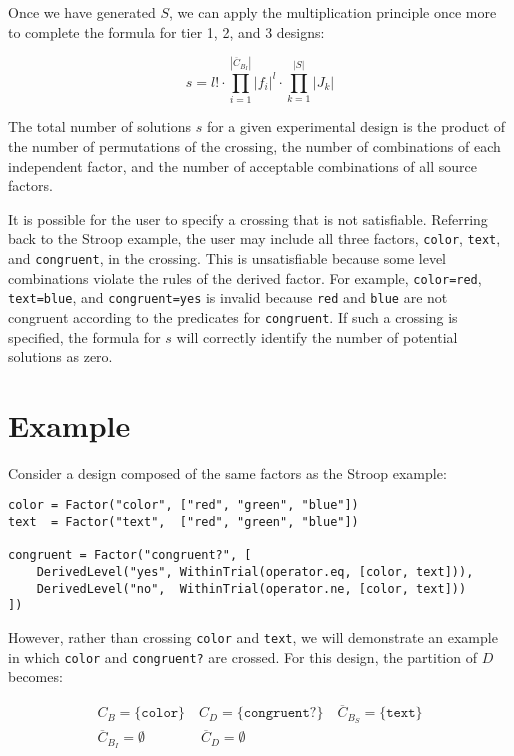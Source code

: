 Once we have generated $S$, we can apply the multiplication principle once more to complete the formula for tier 1, 2, and 3 designs:

\[
s = l! \cdot \prod_{i=1}^{|\overline{C}_{B_I}|} |f_i|^l \cdot \prod_{k=1}^{|S|} |J_k|
\]

The total number of solutions $s$ for a given experimental design is the product of the number of permutations of the crossing, the number of combinations of each independent factor, and the number of acceptable combinations of all source factors.

It is possible for the user to specify a crossing that is not satisfiable. Referring back to the Stroop example, the user may include all three factors, \texttt{color}, \texttt{text}, and \texttt{congruent}, in the crossing. This is unsatisfiable because some level combinations violate the rules of the derived factor. For example, \texttt{color=red}, \texttt{text=blue}, and \texttt{congruent=yes} is invalid because \texttt{red} and \texttt{blue} are not congruent according to the predicates for \texttt{congruent}. If such a crossing is specified, the formula for $s$ will correctly identify the number of potential solutions as zero.

\section{Example}

Consider a design composed of the same factors as the Stroop example:

\begin{verbatim}
color = Factor("color", ["red", "green", "blue"])
text  = Factor("text",  ["red", "green", "blue"])

congruent = Factor("congruent?", [
    DerivedLevel("yes", WithinTrial(operator.eq, [color, text])),
    DerivedLevel("no",  WithinTrial(operator.ne, [color, text]))
])
\end{verbatim}

However, rather than crossing \texttt{color} and \texttt{text}, we will demonstrate an example in which \texttt{color} and \texttt{congruent?} are crossed. For this design, the partition of $D$ becomes:

\begin{gather*}
    C_B = \{\texttt{color}\} \quad C_D = \{\texttt{congruent?}\}  \quad  \overline{C}_{B_S} = \{\texttt{text}\} \\
    \overline{C}_{B_I} = \emptyset \qquad\qquad \overline{C}_D = \emptyset
\end{gather*}

